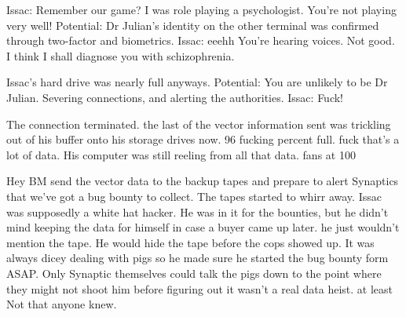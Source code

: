 \documentclass[a4paper,twoside,fontsize=12pt,pagesize=auto]{scrbook}
\begin{document}
Issac: Remember our game? I was role playing a psychologist. You're not playing very well!
Potential: Dr Julian's identity on the other terminal was confirmed through two\hyp{}factor and biometrics.
Issac: eeehh You're hearing voices. Not good. I think I shall diagnose you with schizophrenia.

Issac's hard drive was nearly full anyways.
Potential: You are unlikely to be Dr Julian. Severing connections, and alerting the authorities.
Issac: Fuck!

The connection terminated. the last of the vector information sent was trickling out of his buffer onto his storage drives now. 96 fucking percent full. fuck that's a lot of data. His computer was still reeling from all that data. fans at 100%

Hey BM send the vector data to the backup tapes and prepare to alert Synaptics that we've got a bug bounty to collect. The tapes started to whirr away. Issac was supposedly a white hat hacker. He was in it for the bounties, but he didn't mind keeping the data for himself in case a buyer came up later. he just wouldn't mention the tape. He would hide the tape before the cops showed up. It was always dicey dealing with pigs so he made sure he started the bug bounty form ASAP. Only Synaptic themselves could talk the pigs down to the point where they might not shoot him before figuring out it wasn't a real data heist. at least Not that anyone knew.
\end{document}
